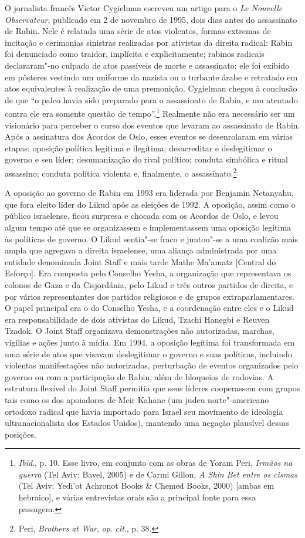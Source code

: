 O jornalista francês Victor Cygielman escreveu um artigo para o \emph{Le
Nouvelle Observateur}, publicado em 2 de novembro de 1995, dois
dias antes do assassinato de Rabin. Nele é relatada uma série de atos
violentos, formas extremas de incitação e cerimonias sinistras
realizadas por ativistas da direita radical: Rabin foi denunciado como
traidor, implícita e explicitamente; rabinos radicais declararam"-no
culpado de atos passíveis de morte e assassinato; ele foi exibido em
pôsteres vestindo um uniforme da  nazista ou o turbante árabe e
retratado em atos equivalentes à realização de uma premonição. Cygielman
chegou à conclusão de que ``o palco havia sido preparado para o assassinato
de Rabin, e um atentado contra ele era somente questão de
tempo''.\footnote{\emph{Ibid}., p. 10. Esse livro, em conjunto com as obras de Yoram Peri, \emph{Irmãos na guerra} (Tel Aviv: Bavel, 2005) e de Carmi Gillon, \emph{A Shin Bet entre os cismas} (Tel
Aviv: Yedi'ot Achronot Books \& Chemed Books, 2000) {[}ambas em hebraico{]}, e várias entrevistas orais são a principal fonte para essa
passagem.} Realmente não era necessário ser um visionário para
perceber o curso dos eventos que levaram ao assassinato de Rabin. Após a
assinatura dos Acordos de Oslo, esses eventos se desenrolaram em várias
etapas: oposição política legítima e ilegítima; desacreditar e
deslegitimar o governo e seu líder; desumanização do rival político;
conduta simbólica e ritual assassino; conduta política violenta e,
finalmente, o assassinato.\footnote{Peri, \emph{Brothers at War}, \emph{op}.
\emph{cit}., p. 38.}

A oposição ao governo de Rabin em 1993 era liderada por Benjamin
Netanyahu, que fora eleito líder do Likud após as eleições de 1992. A
oposição, assim como o público israelense, ficou surpresa e chocada com
os Acordos de Oslo, e levou algum tempo até que se organizassem e
implementassem uma oposição legítima às políticas de governo. O Likud
sentia"-se fraco e juntou"-se a uma coalizão mais ampla que agregava a
direita israelense, uma aliança administrada por uma entidade
denominada Joint Staff e mais tarde Mathe Ma'amatz {[}Central do Esforço{]}.
Era composta pelo Conselho Yesha, a organização que representava os colonos
de Gaza e da Cisjordânia, pelo Likud e três outros partidos de direita, e
por vários representantes dos partidos religiosos e de grupos
extraparlamentares. O papel principal era o do Conselho Yesha, e a
coordenação entre eles e o Likud era responsabilidade de dois ativistas
do Likud, Tzachi Hanegbi e Reuven Tzadok. O Joint Staff organizava
demonstrações não autorizadas, marchas, vigílias e ações junto à mídia.
Em 1994, a oposição legítima foi transformada em uma série de atos que
visavam deslegitimar o governo e suas políticas, incluindo violentas
manifestações não autorizadas, perturbação de eventos organizados pelo
governo ou com a participação de Rabin, além de bloqueios de rodovias. A
estrutura flexível do Joint Staff permitia que seus líderes cooperassem
com grupos tais como os dos apoiadores de Meir Kahane (um judeu
norte"-americano ortodoxo radical que havia importado para Israel seu
movimento de ideologia ultranacionalista dos Estados Unidos), mantendo
uma negação plausível dessas posições.

